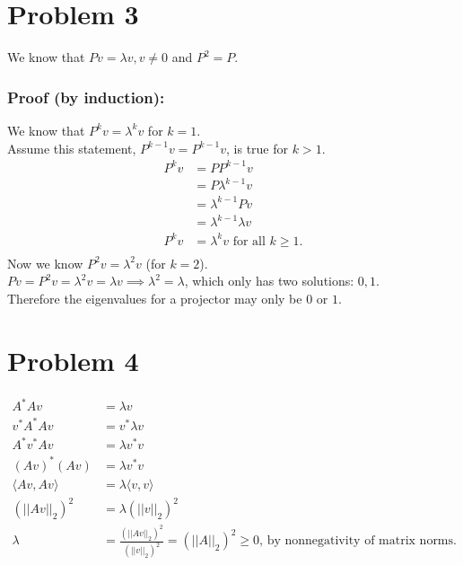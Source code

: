 \documentclass[fleqn]{article}
\begin{document}
\section*{Problem 3}
We know that $Pv =  \lambda v, v\neq 0$ and $P^2=P$.
\subsubsection*{Proof (by induction):}
We know that $P^{k}v =  \lambda^{k} v$ for $k=1$.\\
\linebreak
Assume this statement, $P^{k-1}v =  P^{k-1}v$, is true for $k>1$.
\begin{equation*}
    \begin{split}
        P^{k}v &= PP^{k-1}v\\
        &= P\lambda^{k-1}v\\
        &= \lambda^{k-1}Pv\\
        &= \lambda^{k-1}\lambda v\\
        P^{k}v &= \lambda^{k}v \text{ for all $k\geq 1$.}\\
    \end{split}
\end{equation*}
Now we know $P^2v = \lambda^2 v$ (for $k=2$).\\
$Pv=P^2v=\lambda^2 v = \lambda v \implies \lambda^2=\lambda$, which only has two solutions: $0, 1$.\\
Therefore the eigenvalues for a projector may only be $0$ or $1$.

\section*{Problem 4}
\begin{equation*}
    \begin{split}
        A^{*}Av&=\lambda v\\
        v^{*}A^{*}Av&=v^{*}\lambda v\\
        A^{*}v^{*}Av&=\lambda v^{*} v\\
        (Av)^{*}(Av)&=\lambda v^{*} v\\
        \langle Av, Av \rangle&=\lambda \langle v, v \rangle\\
        (|| Av ||_2)^2&=\lambda (|| v ||_2)^2\\
        \lambda &= \frac{(|| Av ||_2)^2}{(|| v ||_2)^2}=(||A||_2)^2 \geq 0 \text{, by nonnegativity of matrix norms.}
    \end{split}
\end{equation*}
\end{document}
